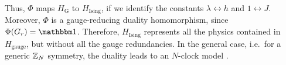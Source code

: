 Thus, $\Phi$ maps $H_{\text{G}}$ to $H_{\text{Ising}}$, if we identify the constants $\lambda \leftrightarrow h$ and $1 \leftrightarrow J$.
Moreover, $\Phi$ is a gauge-reducing duality homomorphism, since $\Phi(G_r) = \One$.
Therefore, $H_{\text{Ising}}$ represents all the physics contained in $H_{\text{gauge}}$, but without all the gauge redundancies.
In the general case, i.e.~for a generic $\mathbb{Z}_N$ symmetry, the duality leads to an $N$-clock model \cite{radicevic2019spin}.






